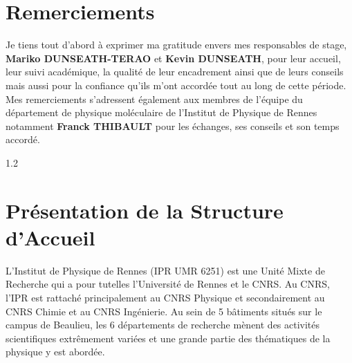 \documentclass[11pt, a4paper, openany]{report}
\begin{document}
\chapter*{Remerciements}

\noindent Je tiens tout d'abord à exprimer ma gratitude envers mes responsables de stage,
\textbf{Mariko DUNSEATH-TERAO} et \textbf{Kevin DUNSEATH}, 
pour leur accueil, 
leur suivi académique, la qualité de leur encadrement ainsi que de leurs 
conseils mais aussi pour la confiance qu'ils m'ont accordée tout au long de 
cette période.\\

\noindent Mes remerciements s'adressent également aux membres de l'équipe du département
de physique moléculaire de l'Institut de Physique de Rennes notamment 
\textbf{Franck THIBAULT} 
pour les échanges, ses conseils et son temps accordé.

\newpage

\begin{spacing}{1.2}
\tableofcontents
\end{spacing}
\newpage
\listoffigures
{}
\newpage

\chapter{Présentation de la Structure d'Accueil}

\noindent L’Institut de Physique de Rennes \cite{structure} (IPR UMR 6251) est 
une Unité Mixte de Recherche qui a pour tutelles l’Université de Rennes et le 
CNRS. Au CNRS, l’IPR est rattaché principalement au CNRS Physique et 
secondairement au CNRS Chimie et au CNRS Ingénierie.
Au sein de 5 bâtiments situés sur le campus de Beaulieu, les 6 départements de
recherche mènent des activités scientifiques extrêmement variées et une grande
partie des thématiques de la physique y est abordée.\\
\end{document}

